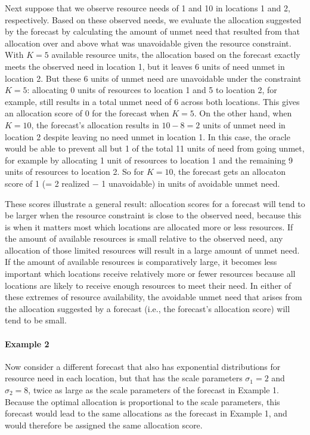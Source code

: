\documentclass{article}\usepackage[]{graphicx}\usepackage[]{xcolor}
\begin{document}
Next suppose that we observe resource needs of 1 and 10 in locations 1 and 2, respectively. Based on these observed
needs, we evaluate the allocation suggested by the forecast by calculating the amount of unmet need that resulted from
that allocation over and above what was unavoidable given the resource constraint. With $K = 5$ available resource
units, the allocation based on the forecast exactly meets the observed need in location 1, but it leaves 6 units of need
unmet in location 2. But these 6 units of unmet need are unavoidable under the constraint $K=5$: allocating 0 units of
resources to location 1 and 5 to location 2, for example, still results in a total unmet need of 6 across both
locations. This gives an allocation score of 0 for the forecast when $K = 5$. On the other hand, when $K = 10$, the
forecast's allocation results in $10 - 8 = 2$ units of unmet need in location 2 despite leaving no need unmet in
location 1. In this case, the oracle would be able to prevent all but 1 of the total 11 units of need from going unmet,
for example by allocating 1 unit of resources to location 1 and the remaining 9 units of resources to location 2. So for
$K = 10$, the forecast gets an allocaton score of 1 (= 2 realized $-$ 1 unavoidable) in units of avoidable unmet need.

These scores illustrate a general result: allocation scores for a forecast will tend to be larger when the resource
constraint is close to the observed need, because this is when it matters most which locations are allocated more or
less resources. If the amount of available resources is small relative to the observed need, any allocation of those
limited resources will result in a large amount of unmet need. If the amount of available resources is comparatively
large, it becomes less important which locations receive relatively more or fewer resources because all locations are
likely to
receive enough resources to meet their need. In either of these extremes of resource availability, the avoidable unmet
need that arises from the allocation suggested by a forecast (i.e., the forecast's allocation score) will tend to be
small.

\paragraph{Example 2} Now consider a different forecast that also has exponential distributions for resource need in
each location, but that has the scale parameters $\sigma_1 = 2$ and $\sigma_2 = 8$, twice as large as the scale
parameters of the forecast in Example 1. Because the optimal allocation is proportional to the scale parameters, this
forecast would lead to the same allocations as the forecast in Example 1, and would therefore be assigned the same
allocation score.
\end{document}
